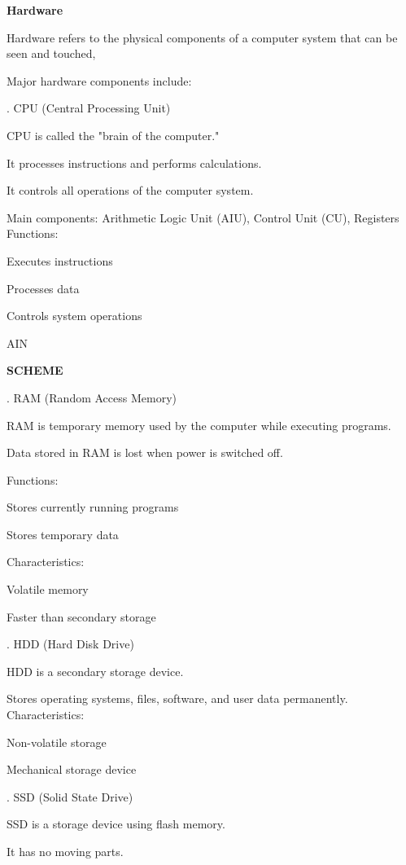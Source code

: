 \documentclass[10pt,a4paper]{article}
\begin{document}
\medskip\noindent\textbf{Hardware}\par
\noindent Hardware refers to the physical components of a computer system that can be seen and touched,\par

\noindent Major hardware components include:\par
{}. CPU (Central Processing Unit)\par
\noindent\textbullet\; CPU is called the "brain of the computer."\par
\noindent\textbullet\; It processes instructions and performs calculations.\par
\noindent\textbullet\; It controls all operations of the computer system.\par
\noindent\textbullet\; Main components: Arithmetic Logic Unit (AIU), Control Unit (CU), Registers Functions:\par
\noindent\textbullet\; Executes instructions\par
\noindent\textbullet\; Processes data\par
\noindent\textbullet\; Controls system operations\par
\noindent AIN\par
\medskip\noindent\textbf{SCHEME}\par
{}. RAM (Random Access Memory)\par
\noindent\textbullet\; RAM is temporary memory used by the computer while executing programs.\par
\noindent\textbullet\; Data stored in RAM is lost when power is switched off.\par

\noindent Functions:\par
\noindent\textbullet\; Stores currently running programs\par
\noindent\textbullet\; Stores temporary data\par

\noindent Characteristics:\par
\noindent\textbullet\; Volatile memory\par
\noindent\textbullet\; Faster than secondary storage\par
{}. HDD (Hard Disk Drive)\par
\noindent\textbullet\; HDD is a secondary storage device.\par
\noindent\textbullet\; Stores operating systems, files, software, and user data permanently. Characteristics:\par
\noindent\textbullet\; Non-volatile storage\par
\noindent\textbullet\; Mechanical storage device\par
\clearpage
{}. SSD (Solid State Drive)\par
\noindent\textbullet\; SSD is a storage device using flash memory.\par
\noindent\textbullet\; It has no moving parts.\par
\end{document}
